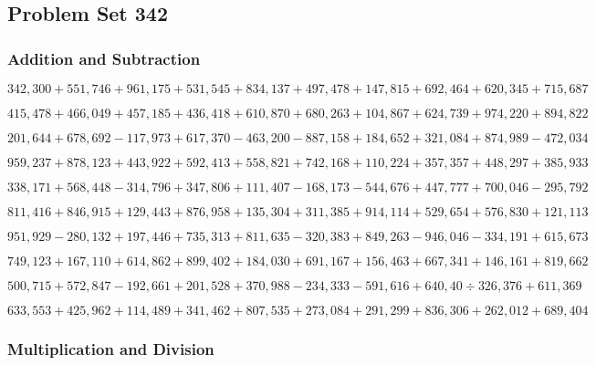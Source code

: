 \hypertarget{problem-set-342}{%
\subsection{Problem Set 342}\label{problem-set-342}}

\hypertarget{addition-and-subtraction}{%
\subsubsection{Addition and
Subtraction}\label{addition-and-subtraction}}

\(342,300+551,746+961,175+531,545+834,137+497,478+147,815+692,464+620,345+715,687\)

\(415,478+466,049+457,185+436,418+610,870+680,263+104,867+624,739+974,220+894,822\)

\(201,644+678,692-117,973+617,370-463,200-887,158+184,652+321,084+874,989-472,034\)

\(959,237+878,123+443,922+592,413+558,821+742,168+110,224+357,357+448,297+385,933\)

\(338,171+568,448-314,796+347,806+111,407-168,173-544,676+447,777+700,046-295,792\)

\(811,416+846,915+129,443+876,958+135,304+311,385+914,114+529,654+576,830+121,113\)

\(951,929-280,132+197,446+735,313+811,635-320,383+849,263-946,046-334,191+615,673\)

\(749,123+167,110+614,862+899,402+184,030+691,167+156,463+667,341+146,161+819,662\)

\(500,715+572,847-192,661+201,528+370,988-234,333-591,616+640,40÷326,376+611,369\)

\(633,553+425,962+114,489+341,462+807,535+273,084+291,299+836,306+262,012+689,404\)

\hypertarget{multiplication-and-division}{%
\subsubsection{Multiplication and
Division}\label{multiplication-and-division}}

